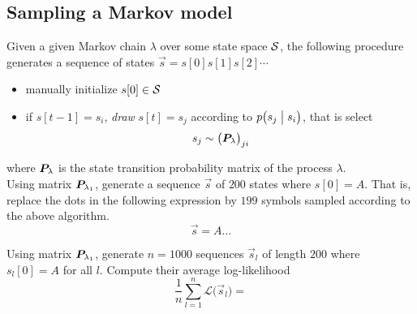 
\color{black}
\subsection*{Sampling a Markov model}

Given a given Markov chain $\lambda$ over some state space $\mathcal{S}$, the following procedure generates a sequence of states $\vec{s} = s[0] s[1] s[2] \cdots$ 
\begin{itemize}
\item[] manually initialize $s[0] \in \mathcal{S}$
\item[] if $s[t-1] = s_i$, \emph{draw} $s[t] = s_j$ according to $p\bigl( s_j \bigm| s_i \bigr)$, that is select
\begin{equation*}
s_j \sim \bigl( \bm{P}_\lambda \bigr)_{ji}
\end{equation*}
\end{itemize}
where $\bm{P}_\lambda$ is the state transition probability matrix of the process $\lambda$. \\[1ex]

Using matrix $\bm{P}_{\lambda_1}$, generate a sequence $\vec{s}$ of $200$ states where $s[0] = A$. That is, replace the dots in the following expression by $199$ symbols sampled according to the above algorithm. 
\color{blue}
\begin{equation*}
\vec{s} = A \ldots
\end{equation*}
\color{black}

Using matrix $\bm{P}_{\lambda_1}$, generate $n=1000$ sequences $\vec{s}_l$ of length $200$ where $s_l[0] = A$ for all $l$. Compute their average log-likelihood 
\color{blue}
\begin{equation*}
\frac{1}{n} \sum_{l=1}^n  \mathcal{L}\bigl( \vec{s}_l \bigr) = 
\end{equation*}
\color{black}